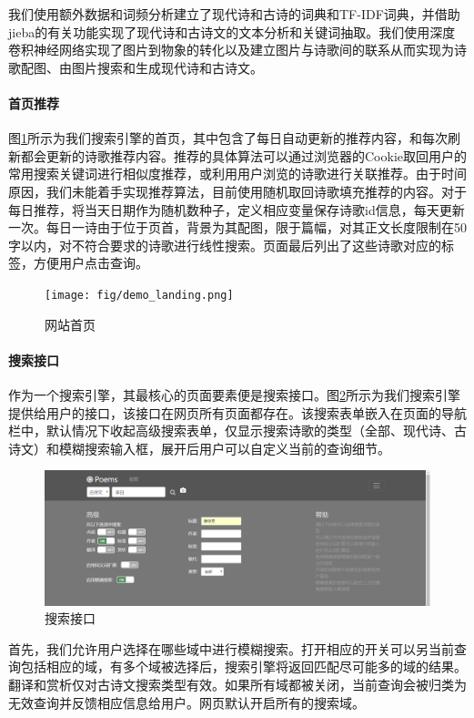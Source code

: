 \documentclass[a4paper, 10pt]{article}
\begin{document}
我们使用额外数据和词频分析建立了现代诗和古诗的词典和TF-IDF词典，并借助jieba的有关功能实现了现代诗和古诗文的文本分析和关键词抽取。我们使用深度卷积神经网络实现了图片到物象的转化以及建立图片与诗歌间的联系从而实现为诗歌配图、由图片搜索和生成现代诗和古诗文。

\paragraph*{首页推荐} 图\ref{fig:demo_landing}所示为我们搜索引擎的首页，其中包含了每日自动更新的推荐内容，和每次刷新都会更新的诗歌推荐内容。推荐的具体算法可以通过浏览器的Cookie取回用户的常用搜索关键词进行相似度推荐，或利用用户浏览的诗歌进行关联推荐。由于时间原因，我们未能着手实现推荐算法，目前使用随机取回诗歌填充推荐的内容。对于每日推荐，将当天日期作为随机数种子，定义相应变量保存诗歌id信息，每天更新一次。每日一诗由于位于页首，背景为其配图，限于篇幅，对其正文长度限制在50字以内，对不符合要求的诗歌进行线性搜索。页面最后列出了这些诗歌对应的标签，方便用户点击查询。

\begin{figure}[H]
\centering
\texttt{[image: fig/demo\_landing.png]}
\caption{网站首页}
\label{fig:demo_landing}
\end{figure}

\paragraph*{搜索接口} 作为一个搜索引擎，其最核心的页面要素便是搜索接口。图\ref{fig:demo_searchbar}所示为我们搜索引擎提供给用户的接口，该接口在网页所有页面都存在。该搜索表单嵌入在页面的导航栏中，默认情况下收起高级搜索表单，仅显示搜索诗歌的类型（全部、现代诗、古诗文）和模糊搜索输入框，展开后用户可以自定义当前的查询细节。

\begin{figure}[H]
\centering
\includegraphics[scale=0.5]{fig/demo_searchbar.png}
\caption{搜索接口}
\label{fig:demo_searchbar}
\end{figure}

首先，我们允许用户选择在哪些域中进行模糊搜索。打开相应的开关可以另当前查询包括相应的域，有多个域被选择后，搜索引擎将返回匹配尽可能多的域的结果。翻译和赏析仅对古诗文搜索类型有效。如果所有域都被关闭，当前查询会被归类为无效查询并反馈相应信息给用户。网页默认开启所有的搜索域。
\end{document}

